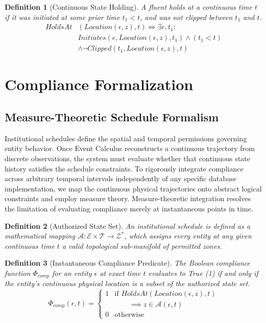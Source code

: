 \documentclass[conference]{IEEEtran}
\newtheorem{definition}{Definition}
\newcommand{\E}{\mathcal{E}} %
\newcommand{\Z}{\mathcal{Z}} %
\newcommand{\T}{\mathcal{T}} %
\newcommand{\Auth}{\mathcal{A}} %
\begin{document}
\begin{definition}[Continuous State Holding]
A fluent holds at a continuous time $t$ if it was initiated at some prior time $t_1 < t$, and was not clipped between $t_1$ and $t$.
\begin{equation}
\begin{aligned}
HoldsAt&(Location(\epsilon, z), t) \iff \exists e, t_1 : \\
& Initiates(e, Location(\epsilon, z), t_1) \land (t_1 < t) \\
& \land \neg Clipped(t_1, Location(\epsilon, z), t)
\end{aligned}
\end{equation}
\end{definition}

\section{Compliance Formalization}

\subsection{Measure-Theoretic Schedule Formalism}
Institutional schedules define the spatial and temporal permissions governing entity behavior. Once Event Calculus reconstructs a continuous trajectory from discrete observations, the system must evaluate whether that continuous state history satisfies the schedule constraints. To rigorously integrate compliance across arbitrary temporal intervals independently of any specific database implementation, we map the continuous physical trajectories onto abstract logical constraints and employ measure theory. Measure-theoretic integration resolves the limitation of evaluating compliance merely at instantaneous points in time.

\begin{definition}[Authorized State Set]
An institutional schedule is defined as a mathematical mapping $\Auth: \E \times \T \to \Z^*$, which assigns every entity at any given continuous time $t$ a valid topological sub-manifold of permitted zones. 
\end{definition}

\begin{definition}[Instantaneous Compliance Predicate]
The Boolean compliance function $\Phi_{comp}$ for an entity $\epsilon$ at exact time $t$ evaluates to True (1) if and only if the entity's continuous physical location is a subset of the authorized state set.
\begin{equation}
\Phi_{comp}(\epsilon, t) = \begin{cases} 
1 & \text{if } HoldsAt(Location(\epsilon, z), t) \\
  & \qquad \implies z \in \Auth(\epsilon, t) \\
0 & \text{otherwise} 
\end{cases}
\end{equation}
\end{definition}
\end{document}
